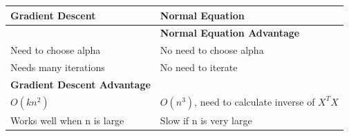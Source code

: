 \documentclass[
]{article}
\begin{document}
\begin{longtable}[]{@{}ll@{}}
\toprule
\begin{minipage}[b]{0.38\columnwidth}\raggedright
Gradient Descent\strut
\end{minipage} & \begin{minipage}[b]{0.56\columnwidth}\raggedright
Normal Equation\strut
\end{minipage}\tabularnewline
\midrule
\endhead
\begin{minipage}[t]{0.38\columnwidth}\raggedright
\strut
\end{minipage} & \begin{minipage}[t]{0.56\columnwidth}\raggedright
\textbf{Normal Equation Advantage}\strut
\end{minipage}\tabularnewline
\begin{minipage}[t]{0.38\columnwidth}\raggedright
Need to choose alpha\strut
\end{minipage} & \begin{minipage}[t]{0.56\columnwidth}\raggedright
No need to choose alpha\strut
\end{minipage}\tabularnewline
\begin{minipage}[t]{0.38\columnwidth}\raggedright
Needs many iterations\strut
\end{minipage} & \begin{minipage}[t]{0.56\columnwidth}\raggedright
No need to iterate\strut
\end{minipage}\tabularnewline
\begin{minipage}[t]{0.38\columnwidth}\raggedright
\textbf{Gradient Descent Advantage}\strut
\end{minipage} & \begin{minipage}[t]{0.56\columnwidth}\raggedright
\strut
\end{minipage}\tabularnewline
\begin{minipage}[t]{0.38\columnwidth}\raggedright
\(O(kn^2)\)\strut
\end{minipage} & \begin{minipage}[t]{0.56\columnwidth}\raggedright
\(O(n^3)\), need to calculate inverse of \(X^TX\)\strut
\end{minipage}\tabularnewline
\begin{minipage}[t]{0.38\columnwidth}\raggedright
Works well when n is large\strut
\end{minipage} & \begin{minipage}[t]{0.56\columnwidth}\raggedright
Slow if n is very large\strut
\end{minipage}\tabularnewline
\bottomrule
\end{longtable}
\end{document}
